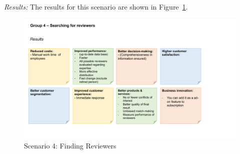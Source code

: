\vspace{0.1cm}
\noindent\textit{Results:} The results for this scenario are shown in Figure~\ref{fig:appendix:fig4}.

\begin{figure}[h!]
    \centering
    \caption{Scenario 4: Finding Reviewers}
    \label{fig:appendix:fig4}
    \includegraphics[width=\textwidth]{figures/results_4.pdf}
\end{figure}








    

